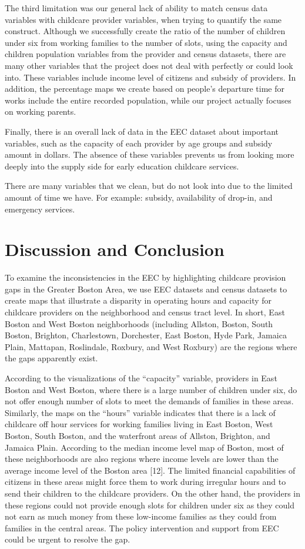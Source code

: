 \documentclass[10pt,letterpaper]{article}
\begin{document}
The third limitation was our general lack of ability to match census
data variables with childcare provider variables, when trying to
quantify the same construct. Although we successfully create the ratio
of the number of children under six from working families to the number
of slots, using the capacity and children population variables from the
provider and census datasets, there are many other variables that the
project does not deal with perfectly or could look into. These variables
include income level of citizens and subsidy of providers. In addition,
the percentage maps we create based on people's departure time for works
include the entire recorded population, while our project actually
focuses on working parents.

Finally, there is an overall lack of data in the EEC dataset about
important variables, such as the capacity of each provider by age groups
and subsidy amount in dollars. The absence of these variables prevents
us from looking more deeply into the supply side for early education
childcare services.

There are many variables that we clean, but do not look into due to the
limited amount of time we have. For example: subsidy, availability of
drop-in, and emergency services.

\section{Discussion and Conclusion}\label{discussion-and-conclusion}

To examine the inconsistencies in the EEC by highlighting childcare
provision gaps in the Greater Boston Area, we use EEC datasets and
census datasets to create maps that illustrate a disparity in operating
hours and capacity for childcare providers on the neighborhood and
census tract level. In short, East Boston and West Boston neighborhoods
(including Allston, Boston, South Boston, Brighton, Charlestown,
Dorchester, East Boston, Hyde Park, Jamaica Plain, Mattapan, Roslindale,
Roxbury, and West Roxbury) are the regions where the gaps apparently
exist.

According to the visualizations of the ``capacity'' variable, providers
in East Boston and West Boston, where there is a large number of
children under six, do not offer enough number of slots to meet the
demands of families in these areas. Similarly, the maps on the ``hours''
variable indicates that there is a lack of childcare off hour services
for working families living in East Boston, West Boston, South Boston,
and the waterfront areas of Allston, Brighton, and Jamaica Plain.
According to the median income level map of Boston, most of these
neighborhoods are also regions where income levels are lower than the
average income level of the Boston area {[}12{]}. The limited financial
capabilities of citizens in these areas might force them to work during
irregular hours and to send their children to the childcare providers.
On the other hand, the providers in these regions could not provide
enough slots for children under six as they could not earn as much money
from these low-income families as they could from families in the
central areas. The policy intervention and support from EEC could be
urgent to resolve the gap.
\end{document}
